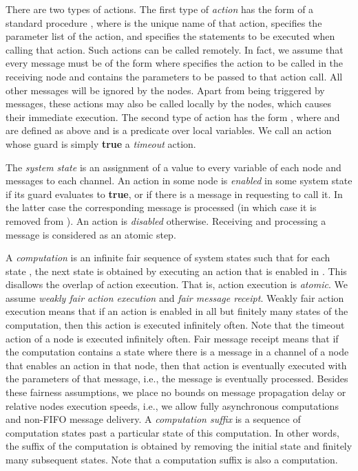 \documentclass[a4paper,USenglish]{lipics}
\begin{document}
There are two types of actions. 
The first type of \emph{action} has the form of a standard procedure 
, where  is the unique name of that action,
 specifies the parameter list of the action, and 
specifies the statements to be executed when calling that action. Such actions
can be called remotely. In fact, we assume that every message must be of the
form  where 
specifies the action to be called in the receiving node and 
contains the parameters to be passed to that action call. All other messages
will be ignored by the nodes. Apart from being triggered by messages,
these actions may also be called locally by the nodes, which causes their
immediate execution. 
The second type of action has the form ,
where  and  are defined as above and  is a predicate
over local variables. We call an action whose guard is simply \textbf{true} a
\emph{timeout} action.

The \emph{system state} is an assignment of a value to every variable of each node and messages to each channel. 
An action in some node  is \emph{enabled} in some system state if its guard evaluates to \textbf{true}, or if there is a message in  requesting to call it.
In the latter case the corresponding message is processed (in which case it is removed from ).
An action is \emph{disabled} otherwise. 
Receiving and processing a message is considered as an atomic step.

A \emph{computation} is an infinite fair sequence of system states such that
for each state , the next state  is obtained by executing an
action that is enabled in . This disallows the overlap of action
execution. That is, action execution is \emph{atomic}. We assume \emph{weakly
fair action execution} and \emph{fair message receipt}. Weakly fair action
execution means that if an action is enabled in all but finitely many states
of the computation, then this action is executed infinitely
often. Note that the timeout action of a node is executed infinitely
often. Fair message receipt means that if the computation contains a state
where there is a message in a channel of a node that
enables an action in that node, then that action is eventually executed
with the parameters of that message, i.e., the message is eventually
processed. Besides these fairness assumptions, we place no bounds on message
propagation delay or relative nodes execution speeds, i.e., we allow fully
asynchronous computations and non-FIFO message delivery.
A \emph{computation suffix} is a sequence of computation states past a particular state of this computation. 
In other words, the suffix of the computation is obtained by removing the initial state and finitely
many subsequent states. 
Note that a computation suffix is also a computation.
\end{document}
